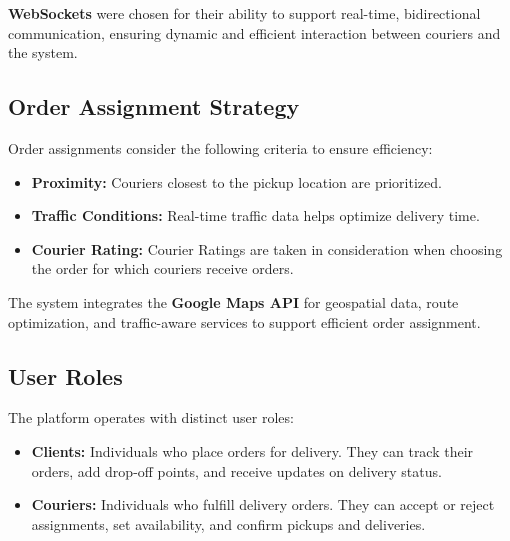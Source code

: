 \textbf{WebSockets} were chosen for their ability to support real-time, bidirectional communication, ensuring dynamic and efficient interaction between couriers and the system.

\subsection{Order Assignment Strategy}

Order assignments consider the following criteria to ensure efficiency:

\begin{itemize}
    \item \textbf{Proximity:} Couriers closest to the pickup location are prioritized.
    \item \textbf{Traffic Conditions:} Real-time traffic data helps optimize delivery time.
    \item \textbf{Courier Rating: } Courier Ratings are taken in consideration when choosing the order for which couriers receive orders.
\end{itemize}

The system integrates the \textbf{Google Maps API} for geospatial data, route optimization, and traffic-aware services to support efficient order assignment.

\subsection{User Roles}
The platform operates with distinct user roles:
\begin{itemize}
    \item \textbf{Clients:} Individuals who place orders for delivery. They can track their orders, add drop-off points, and receive updates on delivery status.
    \item \textbf{Couriers:} Individuals who fulfill delivery orders. They can accept or reject assignments, set availability, and confirm pickups and deliveries.
\end{itemize}
